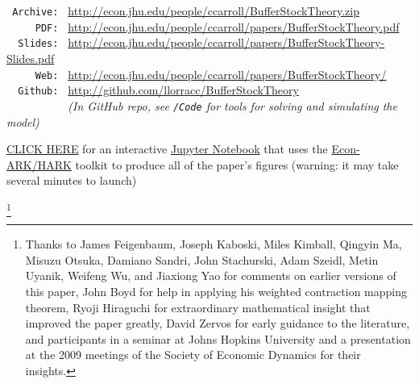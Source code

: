 \documentclass[titlepage]{\econtex}\providecommand{\texname}{BufferStockTheory}%
\begin{document}
\begin{small}
\parbox{\textwidth}{
\begin{center}
\begin{tabbing}
\texttt{~Archive:~} \= \= \url{http://econ.jhu.edu/people/ccarroll/BufferStockTheory.zip} \kill \\  %
\texttt{~~~~~PDF:~} \> \> \url{http://econ.jhu.edu/people/ccarroll/papers/BufferStockTheory.pdf} \\
\texttt{~~Slides:~} \> \> \url{http://econ.jhu.edu/people/ccarroll/papers/BufferStockTheory-Slides.pdf} \\
\texttt{~~~~~Web:~} \> \> \url{http://econ.jhu.edu/people/ccarroll/papers/BufferStockTheory/}    \\
\texttt{~~Github:~} \> \> \url{http://github.com/llorracc/BufferStockTheory} \\
\texttt{~~~~~~~~~~} \> \> \textit{(In GitHub repo, see \texttt{/Code} for tools for solving and simulating the model)} \\
\end{tabbing}
\end{center}
          
\href{https://mybinder.org/v2/gh/econ-ark/REMARK/master?filepath=REMARKs\%2FBufferStockTheory\%2FBufferStockTheory.ipynb}{CLICK HERE} for an interactive \href{http:https://en.wikipedia.org/wiki/Project_Jupyter}{Jupyter Notebook} that uses the \href{https://econ-ark/HARK}{Econ-ARK/HARK} toolkit to produce all of the paper's figures (warning: it may take several minutes to launch)
}
\end{small}

\begin{authorsinfo}
\end{authorsinfo}

\thanks{Thanks to James Feigenbaum, Joseph Kaboski, Miles
  Kimball, Qingyin Ma, Misuzu Otsuka, Damiano Sandri, John Stachurski, Adam Szeidl, Metin Uyanik, Weifeng Wu,
  and Jiaxiong Yao for comments on earlier versions of this paper, John Boyd for help
  in applying his weighted contraction mapping theorem, Ryoji
  Hiraguchi for extraordinary mathematical insight that improved the
  paper greatly, David Zervos for early guidance to the literature,
  and participants in a seminar at Johns Hopkins University and a
  presentation at the 2009 meetings of the Society of Economic
  Dynamics for their insights.}
\end{document}
